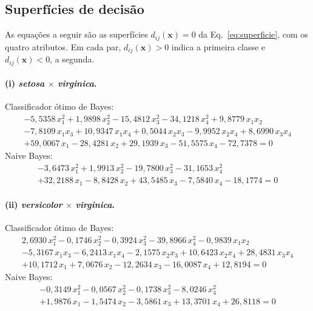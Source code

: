 \documentclass[12pt,a4paper]{article}
\newcommand{\setosa}{\emph{setosa}}
\newcommand{\versicolor}{\emph{versicolor}}
\newcommand{\virginica}{\emph{virginica}}
\begin{document}
\subsection{Superfícies de decisão}\label{sec:superficies}

As equações a seguir são as superfícies $d_{ij}(\mathbf{x}) = 0$ da Eq.~\eqref{eq:superficie}, com os quatro atributos. Em cada par, $d_{ij}(\mathbf{x}) > 0$ indica a primeira classe e $d_{ij}(\mathbf{x}) < 0$, a segunda.

\paragraph{(i) \setosa{} $\times$ \virginica{}.} Classificador ótimo de Bayes:
{\small
\begin{multline*}
 - 5{,}5358\,x_1^2 + 1{,}9898\,x_2^2 - 15{,}4812\,x_3^2 - 34{,}1218\,x_4^2 + 9{,}8779\,x_1x_2 \\
 - 7{,}8109\,x_1x_3 + 10{,}9347\,x_1x_4 + 0{,}5044\,x_2x_3 - 9{,}9952\,x_2x_4 + 8{,}6990\,x_3x_4 \\
 + 59{,}0067\,x_1 - 28{,}4281\,x_2 + 29{,}1939\,x_3 - 51{,}5575\,x_4 - 72{,}7378 = 0
\end{multline*}}
Naive Bayes:
{\small
\begin{multline*}
 - 3{,}6473\,x_1^2 + 1{,}9913\,x_2^2 - 19{,}7800\,x_3^2 - 31{,}1653\,x_4^2 \\
 + 32{,}2188\,x_1 - 8{,}8428\,x_2 + 43{,}5485\,x_3 - 7{,}5840\,x_4 - 18{,}1774 = 0
\end{multline*}}

\paragraph{(ii) \versicolor{} $\times$ \virginica{}.} Classificador ótimo de Bayes:
{\small
\begin{multline*}
 2{,}6930\,x_1^2 - 0{,}1746\,x_2^2 - 0{,}3924\,x_3^2 - 39{,}8966\,x_4^2 - 0{,}9839\,x_1x_2 \\
 - 5{,}3167\,x_1x_3 - 6{,}2413\,x_1x_4 - 2{,}1575\,x_2x_3 + 10{,}6423\,x_2x_4 + 28{,}4831\,x_3x_4 \\
 + 10{,}1712\,x_1 + 7{,}0676\,x_2 - 12{,}2634\,x_3 - 16{,}0087\,x_4 + 12{,}8194 = 0
\end{multline*}}
Naive Bayes:
{\small
\begin{multline*}
 - 0{,}3149\,x_1^2 - 0{,}0567\,x_2^2 - 0{,}1738\,x_3^2 - 8{,}0246\,x_4^2 \\
 + 1{,}9876\,x_1 - 1{,}5474\,x_2 - 3{,}5861\,x_3 + 13{,}3701\,x_4 + 26{,}8118 = 0
\end{multline*}}
\end{document}
